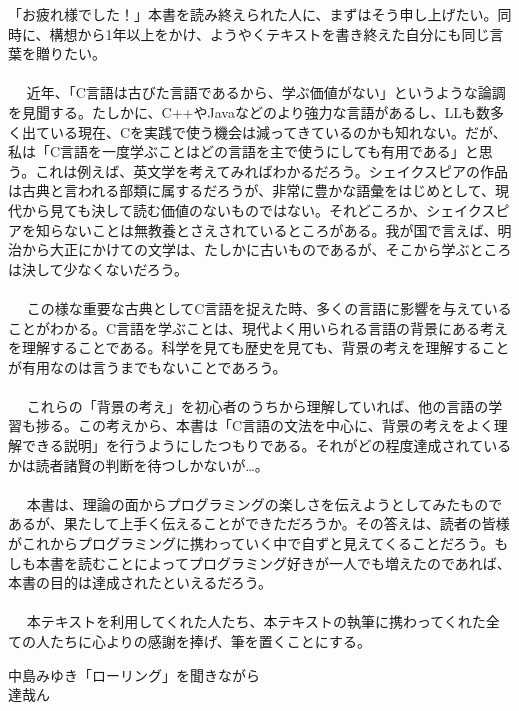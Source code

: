 「お疲れ様でした！」本書を読み終えられた人に、まずはそう申し上げたい。同時に、構想から1年以上をかけ、ようやくテキストを書き終えた自分にも同じ言葉を贈りたい。
\\ \\　
近年、「C言語は古びた言語であるから、学ぶ価値がない」というような論調を見聞する。たしかに、C++やJavaなどのより強力な言語があるし、LLも数多く出ている現在、Cを実践で使う機会は減ってきているのかも知れない。だが、私は「C言語を一度学ぶことはどの言語を主で使うにしても有用である」と思う。これは例えば、英文学を考えてみればわかるだろう。シェイクスピアの作品は古典と言われる部類に属するだろうが、非常に豊かな語彙をはじめとして、現代から見ても決して読む価値のないものではない。それどころか、シェイクスピアを知らないことは無教養とさえされているところがある。我が国で言えば、明治から大正にかけての文学は、たしかに古いものであるが、そこから学ぶところは決して少なくないだろう。
\\ \\　
この様な重要な古典としてC言語を捉えた時、多くの言語に影響を与えていることがわかる。C言語を学ぶことは、現代よく用いられる言語の背景にある考えを理解することである。科学を見ても歴史を見ても、背景の考えを理解することが有用なのは言うまでもないことであろう。
\\ \\　
これらの「背景の考え」を初心者のうちから理解していれば、他の言語の学習も捗る。この考えから、本書は「C言語の文法を中心に、背景の考えをよく理解できる説明」を行うようにしたつもりである。それがどの程度達成されているかは読者諸賢の判断を待つしかないが…。
\\ \\　
本書は、理論の面からプログラミングの楽しさを伝えようとしてみたものであるが、果たして上手く伝えることができただろうか。その答えは、読者の皆様がこれからプログラミングに携わっていく中で自ずと見えてくることだろう。もしも本書を読むことによってプログラミング好きが一人でも増えたのであれば、本書の目的は達成されたといえるだろう。
\\ \\　
本テキストを利用してくれた人たち、本テキストの執筆に携わってくれた全ての人たちに心よりの感謝を捧げ、筆を置くことにする。
\begin{flushright}
中島みゆき「ローリング」を聞きながら\\
達哉ん
\end{flushright}

